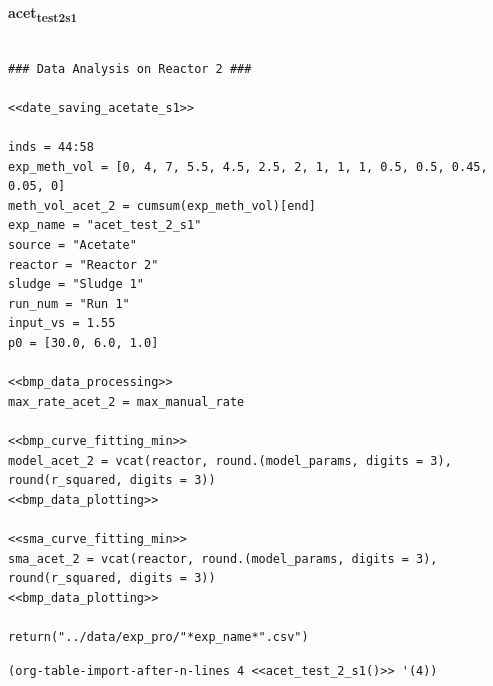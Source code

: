 \documentclass[11pt]{article}
\begin{document}
\textbf{acet\textsubscript{test}\textsubscript{2}\textsubscript{s1}}
\begin{verbatim}

### Data Analysis on Reactor 2 ###

<<date_saving_acetate_s1>>

inds = 44:58
exp_meth_vol = [0, 4, 7, 5.5, 4.5, 2.5, 2, 1, 1, 1, 0.5, 0.5, 0.45, 0.05, 0]
meth_vol_acet_2 = cumsum(exp_meth_vol)[end]
exp_name = "acet_test_2_s1"
source = "Acetate"
reactor = "Reactor 2"
sludge = "Sludge 1"
run_num = "Run 1"
input_vs = 1.55
p0 = [30.0, 6.0, 1.0]

<<bmp_data_processing>>
max_rate_acet_2 = max_manual_rate

<<bmp_curve_fitting_min>>
model_acet_2 = vcat(reactor, round.(model_params, digits = 3), round(r_squared, digits = 3))
<<bmp_data_plotting>>

<<sma_curve_fitting_min>>
sma_acet_2 = vcat(reactor, round.(model_params, digits = 3), round(r_squared, digits = 3))
<<bmp_data_plotting>>

return("../data/exp_pro/"*exp_name*".csv")
\end{verbatim}

\begin{verbatim}
(org-table-import-after-n-lines 4 <<acet_test_2_s1()>> '(4))
\end{verbatim}
\end{document}
